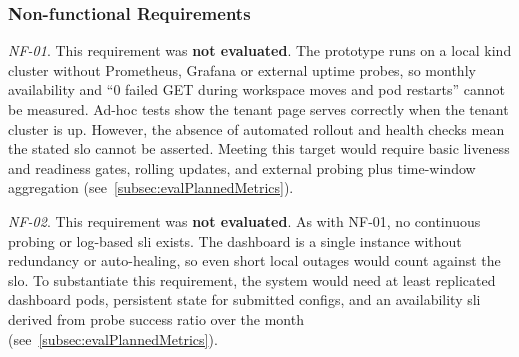 \documentclass[11pt, a4paper, oneside, listof=totoc]{scrartcl}
\begin{document}
            \subsubsection{Non-functional Requirements}\label{subsubsec:evalNonFunctionalRequirements}
                \begin{enumerate}[label={[\arabic*]:},
                    ref=Challenge~\arabic*,
                    leftmargin=*,
                    itemsep=0.6\baselineskip]

                    \item\label{chal:evalNF01}
                        \textit{NF-01}.
                        This requirement was \textbf{not evaluated}.
                        The prototype runs on a local \gls{kind} cluster without Prometheus, Grafana
                        or external uptime probes, so monthly availability and \enquote{0 failed GET
                        during workspace moves and pod restarts} cannot be measured.
                        Ad-hoc tests show the tenant page serves correctly when the tenant cluster
                        is up.
                        However, the absence of automated rollout and health checks mean the stated
                        \gls{slo} cannot be asserted.
                        Meeting this target would require basic liveness and readiness gates,
                        rolling updates, and external probing plus time-window aggregation
                        (see~\autoref{subsec:evalPlannedMetrics}).

                    \item\label{chal:evalNF02}
                        \textit{NF-02}.
                        This requirement was \textbf{not evaluated}.
                        As with NF-01, no continuous probing or log-based \gls{sli} exists.
                        The dashboard is a single instance without redundancy or auto-healing, so
                        even short local outages would count against the \gls{slo}.
                        To substantiate this requirement, the system would need at least replicated
                        dashboard pods, persistent state for submitted configs, and an availability
                        \gls{sli} derived from probe success ratio over the month
                        (see~\autoref{subsec:evalPlannedMetrics}).


\end{enumerate}
\end{document}
